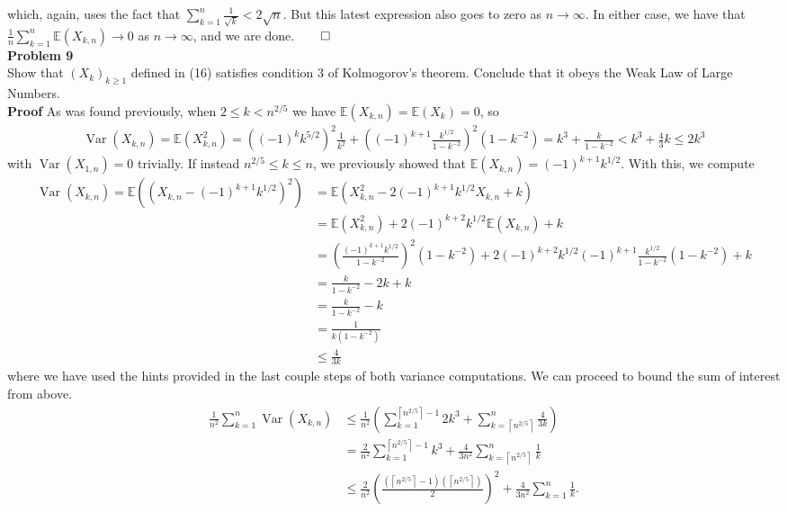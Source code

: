 \documentclass[10pt]{article}
\newcommand{\E}{\mathbb{E}}
\newcommand{\bp}[1]{\left({#1}\right)}
\newcommand{\1}[1]{\mathbbm{1}_{#1}}
\newcommand*{\ceil}[1]{\left\lceil#1\right\rceil}
\DeclareMathOperator{\Var}{Var}
\begin{document}
    which, again, uses the fact that $\sum_{k=1}^n\tfrac{1}{\sqrt{k}}<2\sqrt{n}$. But this latest expression also goes to zero as $n\rightarrow\infty$. In either case, we have that $\frac{1}{n}\sum_{k=1}^n\E(X_{k,n})\rightarrow 0$ as $n\rightarrow\infty$, and we are done.\hfill{$\qed$}\\[5pt]
    {\bf Problem 9}\\[5pt]
    Show that $(X_k)_{k\geq 1}$ defined in (16) satisfies condition $3$ of Kolmogorov's theorem. Conclude that it obeys the Weak Law of Large Numbers.\\[5pt]
    {\bf Proof}\hspace{5pt} As was found previously, when $2\leq k<n^{2/5}$ we have $\E(X_{k,n})=\E(X_k)=0$, so
    \begin{align*}
        \Var(X_{k,n})=\E(X_{k,n}^2)=\bp{(-1)^kk^{5/2}}^2\frac{1}{k^2}+\bp{(-1)^{k+1}\frac{k^{1/2}}{1-k^{-2}}}^2(1-k^{-2})=k^3+\frac{k}{1-k^{-2}}<k^3+\frac{4}{3}k\leq 2k^3
    \end{align*}
    with $\Var(X_{1,n})=0$ trivially. If instead $n^{2/5}\leq k\leq n$, we previously showed that $\E(X_{k,n})=(-1)^{k+1}k^{1/2}$. With this, we compute
    \begin{align*}
        \Var(X_{k,n})=\E((X_{k,n}-(-1)^{k+1}k^{1/2})^2)&=\E(X_{k,n}^2-2(-1)^{k+1}k^{1/2}X_{k,n}+k)\\
        &=\E(X_{k,n}^2)+2(-1)^{k+2}k^{1/2}\E(X_{k,n})+k\\
        &=\bp{\frac{(-1)^{k+1}k^{1/2}}{1-k^{-2}}}^2(1-k^{-2})+2(-1)^{k+2}k^{1/2}(-1)^{k+1}\frac{k^{1/2}}{1-k^{-2}}(1-k^{-2})+k\\
        &=\frac{k}{1-k^{-2}}-2k+k\\
        &=\frac{k}{1-k^{-2}}-k\\
        &=\frac{1}{k(1-k^{-2})}\\
        &\leq\frac{4}{3k}
    \end{align*}
    where we have used the hints provided in the last couple steps of both variance computations. We can proceed to bound the sum of interest from above.
    \begin{align*}
        \frac{1}{n^2}\sum_{k=1}^n\Var(X_{k,n})&\leq\frac{1}{n^2}\bp{\sum_{k=1}^{\ceil{n^{2/5}}-1}2k^3+\sum_{k=\ceil{n^{2/5}}}^n\frac{4}{3k}}\\
        &=\frac{2}{n^2}\sum_{k=1}^{\ceil{n^{2/5}}-1}k^3+\frac{4}{3n^2}\sum_{k=\ceil{n^{2/5}}}^n\frac{1}{k}\\
        &\leq \frac{2}{n^2}\bp{\frac{\bp{\ceil{n^{2/5}}-1}\bp{\ceil{n^{2/5}}}}{2}}^2+\frac{4}{3n^2}\sum_{k=1}^n\frac{1}{k}.
    \end{align*}
\end{document}
